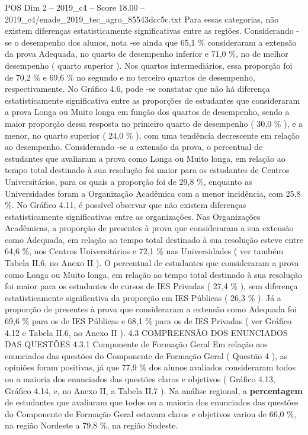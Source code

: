 \begin{textsample}{POS Dim 2 – 2019\_c4 – Score 18.00 – 2019\_c4/enade\_2019\_tec\_agro\_85543dcc5c.txt}
Para essas categorias, não existem diferenças estatisticamente significativas entre as regiões.
Considerando -se o desempenho dos alunos, nota -se ainda que 65,1 \% consideraram a extensão da prova Adequada, no quarto de desempenho inferior e 71,0 \%, no de melhor desempenho ( quarto superior ).
Nos quartos intermediários, essa proporção foi de 70,2 \% e 69,6 \% no segundo e no terceiro quartos de desempenho, respectivamente.
No Gráfico 4.6, pode -se constatar que não há diferença estatisticamente significativa entre as proporções de estudantes que consideraram a prova Longa ou Muito longa em função dos quartos de desempenho, sendo a maior proporção dessa resposta no primeiro quarto de desempenho ( 30,0 \% ), e a menor, no quarto superior ( 24,0 \% ), com uma tendência decrescente em relação ao desempenho.
Considerando -se a extensão da prova, o percentual de estudantes que avaliaram a prova como Longa ou Muito longa, em relação ao tempo total destinado à sua resolução foi maior para os estudantes de Centros Universitários, para os quais a proporção foi de 29,8 \%, enquanto as Universidades foram a Organização Acadêmica com a menor incidência, com 25,8 \%.
No Gráfico 4.11, é possível observar que não existem diferenças estatisticamente significativas entre as organizações.
Nas Organizações Acadêmicas, a proporção de presentes à prova que consideraram a sua extensão como Adequada, em relação ao tempo total destinado à sua resolução esteve entre 64,6 \%, nos Centros Universitários e 72,1 \% nas Universidades ( ver também Tabela II.6, no Anexo II ).
O percentual de estudantes que consideraram a prova como Longa ou Muito longa, em relação ao tempo total destinado à sua resolução foi maior para os estudantes de cursos de IES Privadas ( 27,4 \% ), sem diferença estatisticamente significativa da proporção em IES Públicas ( 26,3 \% ).
Já a proporção de presentes à prova que consideraram a extensão como Adequada foi 69,6 \% para os de IES Públicas e 68,1 \% para os de IES Privadas ( ver Gráfico 4.12 e Tabela II.6, no Anexo II ). 4.3 COMPREENSÃO DOS ENUNCIADOS DAS QUESTÕES 4.3.1 Componente de Formação Geral Em relação aos enunciados das questões do Componente de Formação Geral ( Questão 4 ), as opiniões foram positivas, já que 77,9 \% dos alunos avaliados consideraram todos ou a maioria dos enunciados das questões claros e objetivos ( Gráfico 4.13, Gráfico 4.14, e, no Anexo II, a Tabela II.7 ).
Na análise regional, a \textbf{percentagem} de estudantes que avaliaram que todos ou a maioria dos enunciados das questões do Componente de Formação Geral estavam claros e objetivos variou de 66,0 \%, na região Nordeste a 79,8 \%, na região Sudeste.

\end{textsample}

